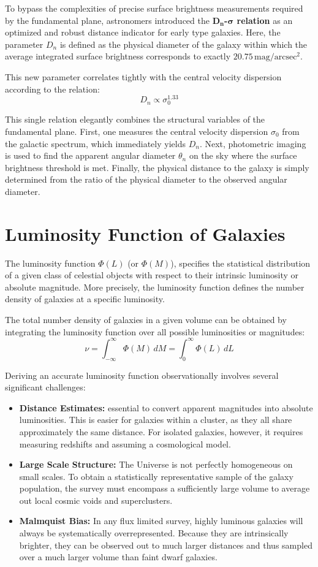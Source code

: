To bypass the complexities of precise surface brightness measurements required by the fundamental plane, astronomers introduced the \textbf{$\mathbf{D_n}$-$\boldsymbol{\sigma}$ relation} as an optimized and robust distance indicator for early type galaxies. Here, the parameter $D_n$ is defined as the physical diameter of the galaxy within which the average integrated surface brightness corresponds to exactly $20.75 \, \mathrm{mag/arcsec^2}$.

This new parameter correlates tightly with the central velocity dispersion according to the relation:
$$
D_n \propto \sigma_0^{1.33}
$$

This single relation elegantly combines the structural variables of the fundamental plane. First, one measures the central velocity dispersion $\sigma_0$ from the galactic spectrum, which immediately yields $D_n$. Next, photometric imaging is used to find the apparent angular diameter $\theta_n$ on the sky where the surface brightness threshold is met. Finally, the physical distance to the galaxy is simply determined from the ratio of the physical diameter to the observed angular diameter.

\section{Luminosity Function of Galaxies}

The luminosity function $\Phi(L)$ (or $\Phi(M)$), specifies the statistical distribution of a given class of celestial objects with respect to their intrinsic luminosity or absolute magnitude. More precisely, the luminosity function defines the number density of galaxies at a specific luminosity.

The total number density of galaxies in a given volume can be obtained by integrating the luminosity function over all possible luminosities or magnitudes:
$$
\nu = \int_{-\infty}^{\infty} \Phi(M) \, dM = \int_0^\infty \Phi(L) \, dL
$$

Deriving an accurate luminosity function observationally involves several significant challenges:
\begin{itemize}
    \item \textbf{Distance Estimates:} essential to convert apparent magnitudes into absolute luminosities. This is easier for galaxies within a cluster, as they all share approximately the same distance. For isolated galaxies, however, it requires measuring redshifts and assuming a cosmological model.
    \item \textbf{Large Scale Structure:} The Universe is not perfectly homogeneous on small scales. To obtain a statistically representative sample of the galaxy population, the survey must encompass a sufficiently large volume to average out local cosmic voids and superclusters.
    \item \textbf{Malmquist Bias:} In any flux limited survey, highly luminous galaxies will always be systematically overrepresented. Because they are intrinsically brighter, they can be observed out to much larger distances and thus sampled over a much larger volume than faint dwarf galaxies.
\end{itemize} 

